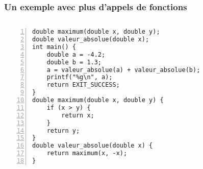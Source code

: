 \documentclass[xcolor=pdftex,svgnames,table]{beamer}
\begin{document}
\begin{frame}[fragile,label=current]
  \frametitle{Un exemple avec plus d'appels de fonctions}
\vspace{-0.5cm}
\begin{columns}
\scriptsize
  \begin{column}[t]{3.7cm}
 \begin{lstlisting}[numbers=left,basicstyle=\ttfamily\scriptsize]
double maximum(double x, double y);
double valeur_absolue(double x);
int main() {
    double a = -4.2;
    double b = 1.3;
    a = valeur_absolue(a) + valeur_absolue(b);
    printf("%g\n", a);
    return EXIT_SUCCESS;
}
double maximum(double x, double y) {
    if (x > y) {
        return x;
    }
    return y;
}
double valeur_absolue(double x) {
    return maximum(x, -x);
}
\end{lstlisting}
\vspace{0.5cm}
 \end{column}
\begin{column}[t]{4cm}
\pause~
\end{column}
\end{columns}
\end{frame}
\end{document}
